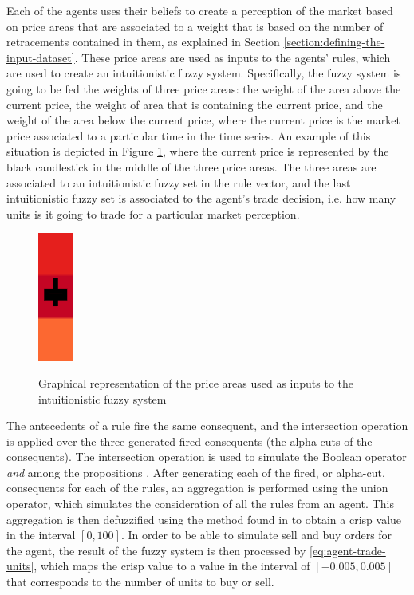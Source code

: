 Each of the agents uses their beliefs to create a perception of the market based
on price areas that are associated to a weight that is based on the number of
retracements contained in them, as explained in Section
\ref{section:defining-the-input-dataset}. These price areas are used as inputs
to the agents' rules, which are used to create an intuitionistic fuzzy
system. Specifically, the fuzzy system is going to be fed the weights of three
price areas: the weight of the area above the current price, the weight of area
that is containing the current price, and the weight of the area below the
current price, where the current price is the market price associated to a
particular time in the time series. An example of this situation is depicted in
Figure \ref{figure:areas-for-ifis}, where the current price is represented by
the black candlestick in the middle of the three price areas. The three areas
are associated to an intuitionistic fuzzy set in the rule vector, and the last
intuitionistic fuzzy set is associated to the agent's trade decision, i.e. how
many units is it going to trade for a particular market perception.

\begin{figure}
\caption{Graphical representation of the price areas used as inputs to the
  intuitionistic fuzzy system} \centering
\includegraphics[height=0.2\textwidth]{img/areas-for-ifis.png}
\label{figure:areas-for-ifis}
\end{figure}

The antecedents of a rule fire the same consequent, and the intersection
operation is applied over the three generated fired consequents (the alpha-cuts
of the consequents). The intersection operation is used to simulate the Boolean
operator \textit{and} among the propositions \cite{Atanassov1986}. After
generating each of the fired, or alpha-cut, consequents for each of the rules,
an aggregation is performed using the union operator, which simulates the
consideration of all the rules from an agent.
This aggregation is then
defuzzified using the method found in \cite{Hernandez-Aguila2017} to obtain a
crisp value in the interval $[0, 100]$. In order to be able to simulate sell and
buy orders for the agent, the result of the fuzzy system is then processed by
\ref{eq:agent-trade-units}, which maps the crisp value to a value in the
interval of $[-0.005, 0.005]$ that corresponds to the number of units to buy or
sell.

